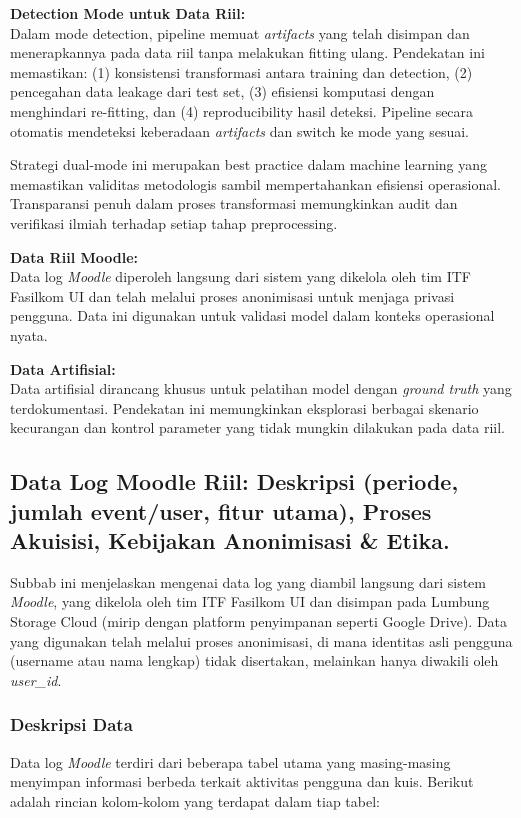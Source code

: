 \textbf{Detection Mode untuk Data Riil:} \\
Dalam mode detection, pipeline memuat \textit{artifacts} yang telah disimpan dan menerapkannya pada data riil tanpa melakukan fitting ulang. Pendekatan ini memastikan: (1) konsistensi transformasi antara training dan detection, (2) pencegahan data leakage dari test set, (3) efisiensi komputasi dengan menghindari re-fitting, dan (4) reproducibility hasil deteksi. Pipeline secara otomatis mendeteksi keberadaan \textit{artifacts} dan switch ke mode yang sesuai.

Strategi dual-mode ini merupakan best practice dalam machine learning yang memastikan validitas metodologis sambil mempertahankan efisiensi operasional. Transparansi penuh dalam proses transformasi memungkinkan audit dan verifikasi ilmiah terhadap setiap tahap preprocessing.

\textbf{Data Riil Moodle:} \\
Data log \textit{Moodle} diperoleh langsung dari sistem yang dikelola oleh tim ITF Fasilkom UI dan telah melalui proses anonimisasi untuk menjaga privasi pengguna. Data ini digunakan untuk validasi model dalam konteks operasional nyata.

\textbf{Data Artifisial:} \\
Data artifisial dirancang khusus untuk pelatihan model dengan \textit{ground truth} yang terdokumentasi. Pendekatan ini memungkinkan eksplorasi berbagai skenario kecurangan dan kontrol parameter yang tidak mungkin dilakukan pada data riil.

\subsection{Data Log Moodle Riil: Deskripsi (periode, jumlah event/user, fitur utama), Proses Akuisisi, Kebijakan Anonimisasi \& Etika.}
\label{sec:logRiil}
Subbab ini menjelaskan mengenai data log yang diambil langsung dari sistem \textit{Moodle}, yang dikelola oleh tim ITF Fasilkom UI dan disimpan pada Lumbung Storage Cloud (mirip dengan platform penyimpanan seperti Google Drive). Data yang digunakan telah melalui proses anonimisasi, di mana identitas asli pengguna (username atau nama lengkap) tidak disertakan, melainkan hanya diwakili oleh \textit{user\_id}.

\subsubsection{Deskripsi Data}
\label{sec:deskripsiData}
Data log \textit{Moodle} terdiri dari beberapa tabel utama yang masing-masing menyimpan informasi berbeda terkait aktivitas pengguna dan kuis. Berikut adalah rincian kolom-kolom yang terdapat dalam tiap tabel:

